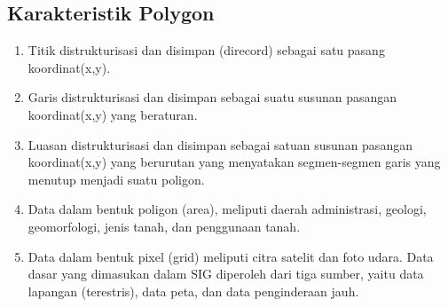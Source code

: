 \subsection{Karakteristik Polygon}
\begin{enumerate}
\item Titik distrukturisasi dan disimpan (direcord) sebagai satu pasang koordinat(x,y).
\item Garis distrukturisasi dan disimpan sebagai suatu susunan pasangan koordinat(x,y) yang beraturan.
\item Luasan distrukturisasi dan disimpan sebagai satuan susunan pasangan koordinat(x,y) yang berurutan yang menyatakan segmen-segmen garis yang menutup menjadi suatu poligon.
\item Data dalam bentuk poligon (area), meliputi daerah administrasi, geologi, geomorfologi, jenis tanah, dan penggunaan tanah. 
\item Data dalam bentuk pixel (grid) meliputi citra satelit dan foto udara. Data dasar yang dimasukan dalam SIG diperoleh dari tiga sumber, yaitu data lapangan (terestris), data peta, dan data penginderaan jauh.
\end{enumerate}

